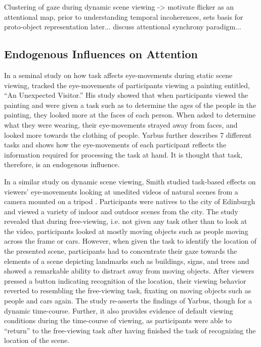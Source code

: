 \documentclass[a4paper,10pt,final]{ThesisStyle}
\begin{document}
Clustering of gaze during dynamic scene viewing -> motivate flicker as an attentional map, prior to understanding temporal incoherences, sets basis for proto-object representation later... discuss attentional synchrony paradigm... 
  	
\subsection{Endogenous Influences on Attention}
\label{sec:endogenous-influences}

In a seminal study on how task affects eye-movements during static scene viewing, \cite{Yarbus1967} tracked the eye-movements of participants viewing a painting entitled, ``An Unexpected Visitor.''  His study showed that when participants viewed the painting and were given a task such as to determine the ages of the people in the painting, they looked more at the faces of each person.  When asked to determine what they were wearing, their eye-movements strayed away from faces, and looked more towards the clothing of people.  Yarbus further describes 7 different tasks and shows how the eye-movements of each participant reflects the information required for processing the task at hand.  It is thought that task, therefore, is an endogenous influence.

In a similar study on dynamic scene viewing, Smith studied task-based effects on viewers' eye-movements looking at unedited videos of natural scenes from a camera mounted on a tripod \cite{Smith2011a}.  Participants were natives to the city of Edinburgh and viewed a variety of indoor and outdoor scenes from the city.  The study revealed that during free-viewing, i.e. not given any task other than to look at the video, participants looked at mostly moving objects such as people moving across the frame or cars.  However, when given the task to identify the location of the presented scene, participants had to concentrate their gaze towards the elements of a scene depicting landmarks such as buildings, signs, and trees and showed a remarkable ability to distract away from moving objects.  After viewers pressed a button indicating recognition of the location, their viewing behavior reverted to resembling the free-viewing task, fixating on moving objects such as people and cars again.  The study re-asserts the findings of Yarbus, though for a dynamic time-course.  Further, it also provides evidence of default viewing conditions during the time-course of viewing, as participants were able to ``return'' to the free-viewing task after having finished the task of recognizing the location of the scene.  
\end{document}
